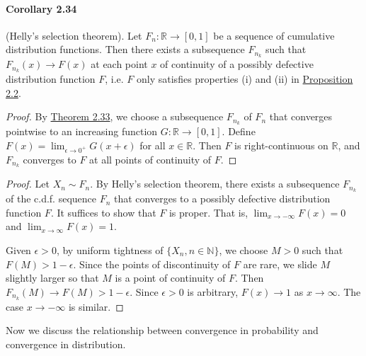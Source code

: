 \documentclass{article}
\numberwithin{equation}{section}
\renewcommand{\proofname}{\textit{Proof}}
\theoremstyle{plain}
\theoremstyle{definition}
\begin{document}
\paragraph{Corollary 2.34\label{cor:2.34}} (Helly's selection theorem). Let $F_n:\mathbb{R}\to[0,1]$ be a sequence of cumulative distribution functions. Then there exists a subsequence $F_{n_k}$ such that $F_{n_k}(x)\to F(x)$ at each point $x$ of continuity of a possibly defective distribution function $F$, i.e. $F$ only satisfies properties (i) and (ii) in \hyperref[prop:2.2]{Proposition 2.2}.
\begin{proof}
By \hyperref[thm:2.33]{Theorem 2.33}, we choose a subsequence $F_{n_k}$ of $F_n$ that converges pointwise to an increasing function $G:\mathbb{R}\to[0,1]$. Define $F(x)=\lim_{\epsilon\to 0^+}G(x+\epsilon)$ for all $x\in\mathbb{R}$. Then $F$ is right-continuous on $\mathbb{R}$, and $F_{n_k}$ converges to $F$ at all points of continuity of $F$.
\end{proof}
\renewcommand{\proofname}{Proof of \hyperref[thm:2.32]{Theorem 2.32 (ii)}}
\begin{proof}
Let $X_n\sim F_n$. By Helly's selection theorem, there exists a subsequence $F_{n_k}$ of the c.d.f. sequence $F_n$ that converges to a possibly defective distribution function $F$. It suffices to show that $F$ is proper. That is, $\lim_{x\to-\infty} F(x)=0$ and $\lim_{x\to\infty} F(x)=1$. 

Given $\epsilon>0$, by uniform tightness of $\{X_n,n\in\mathbb{N}\}$, we choose $M>0$ such that $F(M)>1-\epsilon$. Since the points of discontinuity of $F$ are rare, we slide $M$ slightly larger so that $M$ is a point of continuity of $F$. Then $F_{n_k}(M)\to F(M)>1-\epsilon$. Since $\epsilon>0$ is arbitrary, $F(x)\to 1$ as $x\to\infty$. The case $x\to-\infty$ is similar.
\end{proof}
\renewcommand{\proofname}{Proof}

Now we discuss the relationship between convergence in probability and convergence in distribution.
\end{document}
